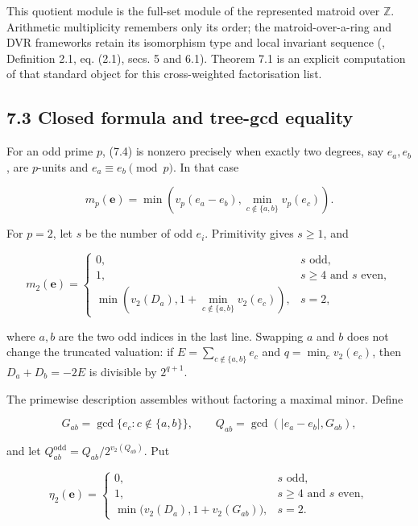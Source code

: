 \documentclass[
  11pt,
  a4paper,
]{article}
\begin{document}
This quotient module is the full-set module of the represented matroid
over \(\mathbb Z\). Arithmetic multiplicity remembers only its order;
the matroid-over-a-ring and DVR frameworks retain its isomorphism type
and local invariant sequence (, Definition 2.1, eq. (2.1), secs. 5 and 6.1). Theorem 7.1 is an
explicit computation of that standard object for this cross-weighted
factorisation list.

\subsection{7.3 Closed formula and tree-gcd
equality}\label{closed-formula-and-tree-gcd-equality}

For an odd prime \(p\), (7.4) is nonzero precisely when exactly two
degrees, say \(e_a,e_b\), are \(p\)-units and \(e_a\equiv e_b\pmod p\).
In that case

\[
 m_p(\mathbf e)=
 \min\left(v_p(e_a-e_b),
            \min_{c\notin\{a,b\}}v_p(e_c)\right).
\tag{7.6}
\]

For \(p=2\), let \(s\) be the number of odd \(e_i\). Primitivity gives
\(s\ge1\), and

\[
 m_2(\mathbf e)=
 \begin{cases}
 0,&s\text{ odd},\\[1mm]
 1,&s\ge4\text{ and }s\text{ even},\\[1mm]
 \min\left(v_2(D_a),1+\min_{c\notin\{a,b\}}v_2(e_c)\right),&s=2,
 \end{cases}
\tag{7.7}
\]

where \(a,b\) are the two odd indices in the last line. Swapping \(a\)
and \(b\) does not change the truncated valuation: if
\(E=\sum_{c\notin\{a,b\}}e_c\) and \(q=\min_cv_2(e_c)\), then
\(D_a+D_b=-2E\) is divisible by \(2^{q+1}\).

The primewise description assembles without factoring a maximal minor.
Define

\[
 G_{ab}=\gcd\{e_c:c\notin\{a,b\}\},\qquad
 Q_{ab}=\gcd(|e_a-e_b|,G_{ab}),
\]

and let \(Q_{ab}^{\mathrm{odd}}=Q_{ab}/2^{v_2(Q_{ab})}\). Put

\[
 \eta_2(\mathbf e)=
 \begin{cases}
 0,&s\text{ odd},\\
 1,&s\ge4\text{ and }s\text{ even},\\
 \min\bigl(v_2(D_a),1+v_2(G_{ab})\bigr),&s=2.
 \end{cases}
\]
\end{document}
